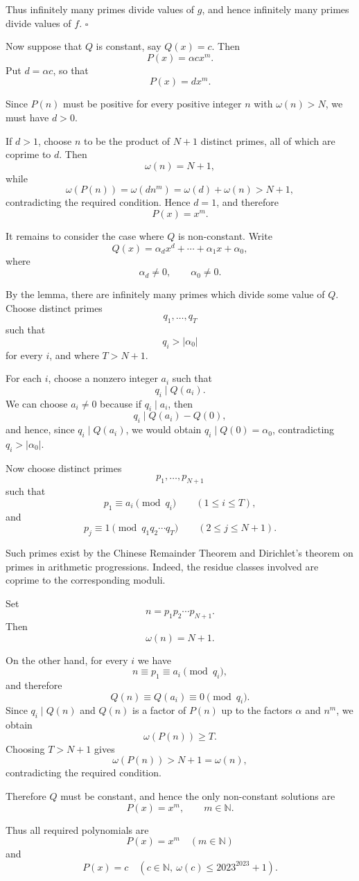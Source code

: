 Thus infinitely many primes divide values of $g$, and hence infinitely many primes divide values of $f$.
\hfill$\square$

Now suppose that $Q$ is constant, say $Q(x)=c$. Then
$$
P(x)=\alpha c x^m.
$$
Put $d=\alpha c$, so that
$$
P(x)=d x^m.
$$

Since $P(n)$ must be positive for every positive integer $n$ with $\omega(n)>N$, we must have $d>0$.

If $d>1$, choose $n$ to be the product of $N+1$ distinct primes, all of which are coprime to $d$. Then
$$
\omega(n)=N+1,
$$
while
$$
\omega(P(n))=\omega(dn^m)=\omega(d)+\omega(n)>N+1,
$$
contradicting the required condition. Hence $d=1$, and therefore
$$
P(x)=x^m.
$$

It remains to consider the case where $Q$ is non-constant. Write
$$
Q(x)=\alpha_d x^d+\cdots+\alpha_1x+\alpha_0,
$$
where
$$
\alpha_d\neq0,\qquad \alpha_0\neq0.
$$

By the lemma, there are infinitely many primes which divide some value of $Q$. Choose distinct primes
$$
q_1,\ldots,q_T
$$
such that
$$
q_i>|\alpha_0|
$$
for every $i$, and where $T>N+1$.

For each $i$, choose a nonzero integer $a_i$ such that
$$
q_i\mid Q(a_i).
$$
We can choose $a_i\neq0$ because if $q_i\mid a_i$, then
$$
q_i\mid Q(a_i)-Q(0),
$$
and hence, since $q_i\mid Q(a_i)$, we would obtain $q_i\mid Q(0)=\alpha_0$, contradicting $q_i>|\alpha_0|$.

Now choose distinct primes
$$
p_1,\ldots,p_{N+1}
$$
such that
$$
p_1\equiv a_i\pmod{q_i}
\qquad (1\leq i\leq T),
$$
and
$$
p_j\equiv1\pmod{q_1q_2\cdots q_T}
\qquad (2\leq j\leq N+1).
$$

Such primes exist by the Chinese Remainder Theorem and Dirichlet's theorem on primes in arithmetic progressions. Indeed, the residue classes involved are coprime to the corresponding moduli.

Set
$$
n=p_1p_2\cdots p_{N+1}.
$$
Then
$$
\omega(n)=N+1.
$$

On the other hand, for every $i$ we have
$$
n\equiv p_1\equiv a_i\pmod{q_i},
$$
and therefore
$$
Q(n)\equiv Q(a_i)\equiv0\pmod{q_i}.
$$
Since $q_i\mid Q(n)$ and $Q(n)$ is a factor of $P(n)$ up to the factors $\alpha$ and $n^m$, we obtain
$$
\omega(P(n))\geq T.
$$
Choosing $T>N+1$ gives
$$
\omega(P(n))>N+1=\omega(n),
$$
contradicting the required condition.

Therefore $Q$ must be constant, and hence the only non-constant solutions are
$$
P(x)=x^m,\qquad m\in\mathbb{N}.
$$

Thus all required polynomials are
$$
\boxed{P(x)=x^m\quad(m\in\mathbb{N})}
$$
and
$$
\boxed{P(x)=c\quad(c\in\mathbb{N},\ \omega(c)\leq2023^{2023}+1)}.
$$